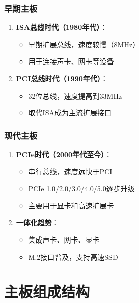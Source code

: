 \documentclass[12pt,UTF8]{ctexbook}
\begin{document}
\section{早期主板}

\begin{enumerate}
    \item \textbf{ISA总线时代（1980年代）}：
    \begin{itemize}[leftmargin=2em]
        \item 早期扩展总线，速度较慢（8MHz）
        \item 用于连接声卡、网卡等设备
    \end{itemize}
    
    \item \textbf{PCI总线时代（1990年代）}：
    \begin{itemize}[leftmargin=2em]
        \item 32位总线，速度提高到33MHz
        \item 取代ISA成为主流扩展接口
    \end{itemize}
\end{enumerate}

\section{现代主板}

\begin{enumerate}
    \item \textbf{PCIe时代（2000年代至今）}：
    \begin{itemize}[leftmargin=2em]
        \item 串行总线，速度远快于PCI
        \item PCIe 1.0/2.0/3.0/4.0/5.0逐步升级
        \item 主要用于显卡和高速扩展卡
    \end{itemize}
    
    \item \textbf{一体化趋势}：
    \begin{itemize}[leftmargin=2em]
        \item 集成声卡、网卡、显卡
        \item M.2接口普及，支持高速SSD
    \end{itemize}
\end{enumerate}

\part{主板组成结构}
\end{document}
